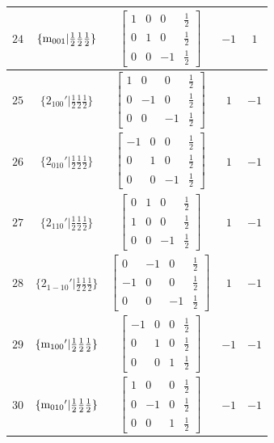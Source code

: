 \documentclass[fleqn,8pt]{jsarticle}
\begin{document}
\begin{longtable}{ccccc}
$ 24 $ & $ \{{\rm m}_{001}|\frac{1}{2} \frac{1}{2} \frac{1}{2}\} $ & $ \begin{bmatrix} 1 & 0 & 0 & \frac{1}{2} \\ 0 & 1 & 0 & \frac{1}{2} \\ 0 & 0 & -1 & \frac{1}{2} \end{bmatrix} $ & $ -1 $ & $ 1 $ \\ \hline
$ 25 $ & $ \{2{}_{100}{}'|\frac{1}{2} \frac{1}{2} \frac{1}{2}\} $ & $ \begin{bmatrix} 1 & 0 & 0 & \frac{1}{2} \\ 0 & -1 & 0 & \frac{1}{2} \\ 0 & 0 & -1 & \frac{1}{2} \end{bmatrix} $ & $ 1 $ & $ -1 $ \\ \hline
$ 26 $ & $ \{2{}_{010}{}'|\frac{1}{2} \frac{1}{2} \frac{1}{2}\} $ & $ \begin{bmatrix} -1 & 0 & 0 & \frac{1}{2} \\ 0 & 1 & 0 & \frac{1}{2} \\ 0 & 0 & -1 & \frac{1}{2} \end{bmatrix} $ & $ 1 $ & $ -1 $ \\ \hline
$ 27 $ & $ \{2{}_{110}{}'|\frac{1}{2} \frac{1}{2} \frac{1}{2}\} $ & $ \begin{bmatrix} 0 & 1 & 0 & \frac{1}{2} \\ 1 & 0 & 0 & \frac{1}{2} \\ 0 & 0 & -1 & \frac{1}{2} \end{bmatrix} $ & $ 1 $ & $ -1 $ \\ \hline
$ 28 $ & $ \{2{}_{1-10}{}'|\frac{1}{2} \frac{1}{2} \frac{1}{2}\} $ & $ \begin{bmatrix} 0 & -1 & 0 & \frac{1}{2} \\ -1 & 0 & 0 & \frac{1}{2} \\ 0 & 0 & -1 & \frac{1}{2} \end{bmatrix} $ & $ 1 $ & $ -1 $ \\ \hline
$ 29 $ & $ \{{\rm m}_{100}{}'|\frac{1}{2} \frac{1}{2} \frac{1}{2}\} $ & $ \begin{bmatrix} -1 & 0 & 0 & \frac{1}{2} \\ 0 & 1 & 0 & \frac{1}{2} \\ 0 & 0 & 1 & \frac{1}{2} \end{bmatrix} $ & $ -1 $ & $ -1 $ \\ \hline
$ 30 $ & $ \{{\rm m}_{010}{}'|\frac{1}{2} \frac{1}{2} \frac{1}{2}\} $ & $ \begin{bmatrix} 1 & 0 & 0 & \frac{1}{2} \\ 0 & -1 & 0 & \frac{1}{2} \\ 0 & 0 & 1 & \frac{1}{2} \end{bmatrix} $ & $ -1 $ & $ -1 $ \\ \hline

\end{longtable}
\end{document}
